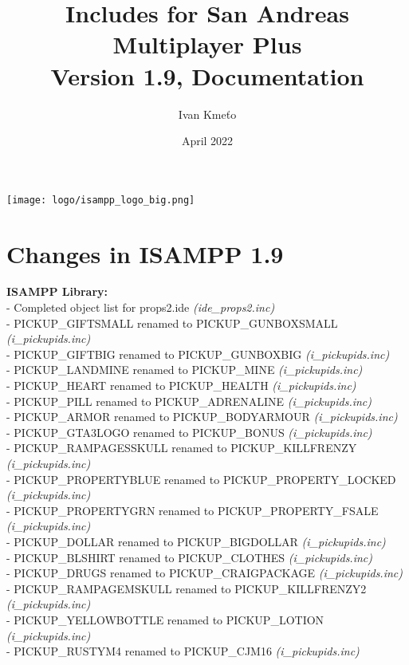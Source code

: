 \documentclass{article}
\title{Includes for San Andreas Multiplayer Plus\\Version 1.9, Documentation}
\author{Ivan Kmeťo}
\date{April 2022}
\begin{document}
\maketitle
\begin{center}
\texttt{[image: logo/isampp\_logo\_big.png]}
\end{center}

\newpage
\tableofcontents

\newpage
\section{Changes in ISAMPP 1.9}
\textbf{ISAMPP Library:}
\\- Completed object list for props2.ide \textit{(ide\_props2.inc)}
\\- PICKUP\_GIFTSMALL renamed to PICKUP\_GUNBOXSMALL \textit{(i\_pickupids.inc)}
\\- PICKUP\_GIFTBIG renamed to PICKUP\_GUNBOXBIG \textit{(i\_pickupids.inc)}
\\- PICKUP\_LANDMINE renamed to PICKUP\_MINE \textit{(i\_pickupids.inc)}
\\- PICKUP\_HEART renamed to PICKUP\_HEALTH \textit{(i\_pickupids.inc)}
\\- PICKUP\_PILL renamed to PICKUP\_ADRENALINE \textit{(i\_pickupids.inc)}
\\- PICKUP\_ARMOR renamed to PICKUP\_BODYARMOUR \textit{(i\_pickupids.inc)}
\\- PICKUP\_GTA3LOGO renamed to PICKUP\_BONUS \textit{(i\_pickupids.inc)}
\\- PICKUP\_RAMPAGESSKULL renamed to PICKUP\_KILLFRENZY \textit{(i\_pickupids.inc)}
\\- PICKUP\_PROPERTYBLUE renamed to PICKUP\_PROPERTY\_LOCKED \textit{(i\_pickupids.inc)}
\\- PICKUP\_PROPERTYGRN renamed to PICKUP\_PROPERTY\_FSALE \textit{(i\_pickupids.inc)}
\\- PICKUP\_DOLLAR renamed to PICKUP\_BIGDOLLAR \textit{(i\_pickupids.inc)}
\\- PICKUP\_BLSHIRT renamed to PICKUP\_CLOTHES \textit{(i\_pickupids.inc)}
\\- PICKUP\_DRUGS renamed to PICKUP\_CRAIGPACKAGE \textit{(i\_pickupids.inc)}
\\- PICKUP\_RAMPAGEMSKULL renamed to PICKUP\_KILLFRENZY2 \textit{(i\_pickupids.inc)}
\\- PICKUP\_YELLOWBOTTLE renamed to PICKUP\_LOTION \textit{(i\_pickupids.inc)}
\\- PICKUP\_RUSTYM4 renamed to PICKUP\_CJM16 \textit{(i\_pickupids.inc)}
\end{document}
